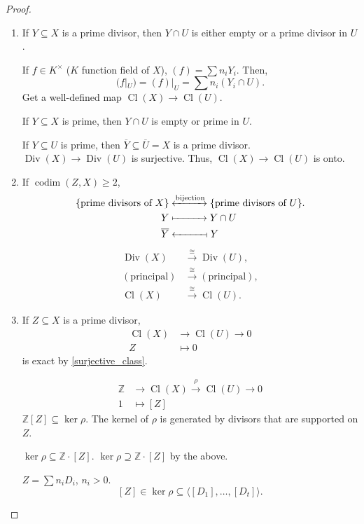 \documentclass[12pt]{article}
\DeclareMathOperator{\codim}{codim}
\DeclareMathOperator{\Div}{Div}
\DeclareMathOperator{\Cl}{Cl}
\theoremstyle{definition}
\theoremstyle{remark}
\begin{document}
\begin{proof}
\begin{enumerate}[label=\arabic*)]
\item If $Y\subseteq X$ is a prime divisor, then $Y\cap U$ is either empty or a prime divisor in $U$.

If $f\in K^{\times}$ ($K$ function field of $X$), $(f)=\sum n_iY_i$. Then,
\[(f|_U)=(f)|_U=\sum n_i(Y_i\cap U).\]
Get a well-defined map $\Cl(X)\rightarrow\Cl(U)$.

If $Y\subseteq X$ is prime, then $Y\cap U$ is empty or prime in $U$.

If $Y\subseteq U$ is prime, then $\overline{Y}\subseteq\overline{U}=X$ is a prime divisor. $\Div(X)\rightarrow\Div(U)$ is surjective. Thus, $\Cl(X)\rightarrow\Cl(U)$ is onto.

\item If $\codim(Z,X)\geq2$,
\begin{align*}
\{\text{prime divisors of }X\}&\xleftrightarrow{\text{bijection}}\{\text{prime divisors of }U\}.\\
Y&\xmapsto{\hphantom{\text{bijection}}}Y\cap U\\
\overline{Y}&\xleftarrow{\hphantom{\text{bijection}}}\!\shortmid Y
\end{align*}
\begin{align*}
\Div(X)&\overset{\cong}{\longrightarrow}\Div(U),\\
(\text{principal})&\overset{\cong}{\longrightarrow}(\text{principal}),\\
\Cl(X)&\overset{\cong}{\longrightarrow}\Cl(U).
\end{align*}

\item If $Z\subseteq X$ is a prime divisor,
\begin{align*}
\Cl(X)&\longrightarrow\Cl(U)\longrightarrow0\\
Z&\longmapsto0
\end{align*}
is exact by \ref{surjective_class}.

\begin{align*}
\mathbb{Z}&\longrightarrow\Cl(X)\overset{\rho}{\longrightarrow}\Cl(U)\longrightarrow0\\
1&\longmapsto[Z]
\end{align*}
$\mathbb{Z}[Z]\subseteq\ker\rho$. The kernel of $\rho$ is generated by divisors that are supported on $Z$.

$\ker\rho\subseteq\mathbb{Z}\cdot[Z]$. $\ker\rho\supseteq\mathbb{Z}\cdot[Z]$ by the above.

$Z=\sum n_iD_i$, $n_i>0$.
\[[Z]\in\ker\rho\subseteq\langle[D_1],\ldots,[D_t]\rangle.\]
\end{enumerate}
\end{proof}
\end{document}
